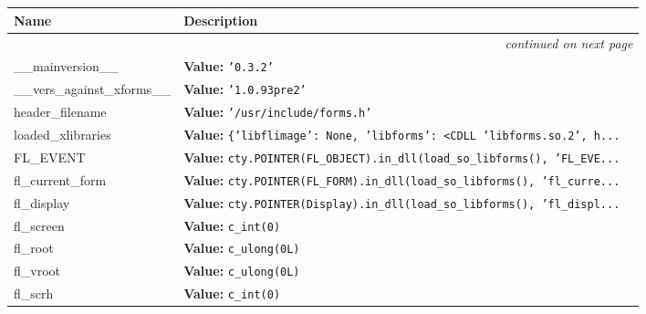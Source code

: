     \vspace{-1cm}
\hspace{\varindent}\begin{longtable}{|p{\varnamewidth}|p{\vardescrwidth}|l}
\cline{1-2}
\cline{1-2} \centering \textbf{Name} & \centering \textbf{Description}& \\
\cline{1-2}
\endhead\cline{1-2}\multicolumn{3}{r}{\small\textit{continued on next page}}\\\endfoot\cline{1-2}
\endlastfoot\raggedright \_\-\_\-m\-a\-i\-n\-v\-e\-r\-s\-i\-o\-n\-\_\-\_\- & \raggedright \textbf{Value:} 
{\tt \texttt{'}\texttt{0.3.2}\texttt{'}}&\\
\cline{1-2}
\raggedright \_\-\_\-v\-e\-r\-s\-\_\-a\-g\-a\-i\-n\-s\-t\-\_\-x\-f\-o\-r\-m\-s\-\_\-\_\- & \raggedright \textbf{Value:} 
{\tt \texttt{'}\texttt{1.0.93pre2}\texttt{'}}&\\
\cline{1-2}
\raggedright h\-e\-a\-d\-e\-r\-\_\-f\-i\-l\-e\-n\-a\-m\-e\- & \raggedright \textbf{Value:} 
{\tt \texttt{'}\texttt{/usr/include/forms.h}\texttt{'}}&\\
\cline{1-2}
\raggedright l\-o\-a\-d\-e\-d\-\_\-x\-l\-i\-b\-r\-a\-r\-i\-e\-s\- & \raggedright \textbf{Value:} 
{\tt \texttt{\{}\texttt{'}\texttt{libflimage}\texttt{'}\texttt{: }None\texttt{, }\texttt{'}\texttt{libforms}\texttt{'}\texttt{: }{\textless}CDLL 'libforms.so.2', h\texttt{...}}&\\
\cline{1-2}
\raggedright F\-L\-\_\-E\-V\-E\-N\-T\- & \raggedright \textbf{Value:} 
{\tt cty.POINTER(FL\_OBJECT).in\_dll(load\_so\_libforms(), 'FL\_EVE\texttt{...}}&\\
\cline{1-2}
\raggedright f\-l\-\_\-c\-u\-r\-r\-e\-n\-t\-\_\-f\-o\-r\-m\- & \raggedright \textbf{Value:} 
{\tt cty.POINTER(FL\_FORM).in\_dll(load\_so\_libforms(), 'fl\_curre\texttt{...}}&\\
\cline{1-2}
\raggedright f\-l\-\_\-d\-i\-s\-p\-l\-a\-y\- & \raggedright \textbf{Value:} 
{\tt cty.POINTER(Display).in\_dll(load\_so\_libforms(), 'fl\_displ\texttt{...}}&\\
\cline{1-2}
\raggedright f\-l\-\_\-s\-c\-r\-e\-e\-n\- & \raggedright \textbf{Value:} 
{\tt c\_int(0)}&\\
\cline{1-2}
\raggedright f\-l\-\_\-r\-o\-o\-t\- & \raggedright \textbf{Value:} 
{\tt c\_ulong(0L)}&\\
\cline{1-2}
\raggedright f\-l\-\_\-v\-r\-o\-o\-t\- & \raggedright \textbf{Value:} 
{\tt c\_ulong(0L)}&\\
\cline{1-2}
\raggedright f\-l\-\_\-s\-c\-r\-h\- & \raggedright \textbf{Value:} 
{\tt c\_int(0)}&\\

\end{longtable}
